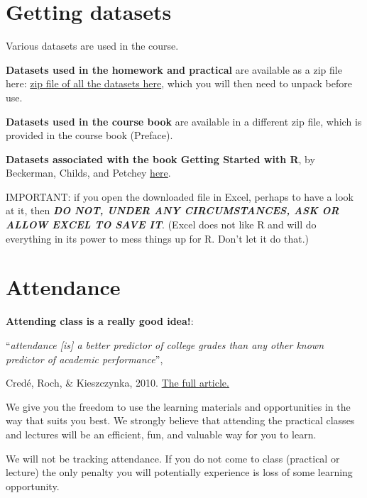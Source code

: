 \documentclass[
  letterpaper,
  8pt,
  a4paper]{book}
\begin{document}
\section*{Getting datasets}\label{getting-datasets}


Various datasets are used in the course.

\textbf{Datasets used in the homework and practical} are available as a
zip file here:
\href{https://github.com/opetchey/BIO144/raw/master/3_datasets/all_datasets_bio144.zip}{zip
file of all the datasets here}, which you will then need to unpack
before use.

\textbf{Datasets used in the course book} are available in a different
zip file, which is provided in the course book (Preface).

\textbf{Datasets associated with the book Getting Started with R}, by
Beckerman, Childs, and Petchey
\href{http://r4all.org/books/datasets/}{here}.

IMPORTANT: if you open the downloaded file in Excel, perhaps to have a
look at it, then \textbf{\emph{DO NOT, UNDER ANY CIRCUMSTANCES, ASK OR
ALLOW EXCEL TO SAVE IT}}. (Excel does not like R and will do everything
in its power to mess things up for R. Don't let it do that.)

\section*{Attendance}\label{attendance}


\textbf{Attending class is a really good idea!}:

``\emph{attendance {[}is{]} a better predictor of college grades than
any other known predictor of academic performance}'',

Credé, Roch, \& Kieszczynka, 2010.
\href{https://journals.sagepub.com/doi/abs/10.3102/0034654310362998}{The
full article.}

We give you the freedom to use the learning materials and opportunities
in the way that suits you best. We strongly believe that attending the
practical classes and lectures will be an efficient, fun, and valuable
way for you to learn.

We will not be tracking attendance. If you do not come to class
(practical or lecture) the only penalty you will potentially experience
is loss of some learning opportunity.
\end{document}
